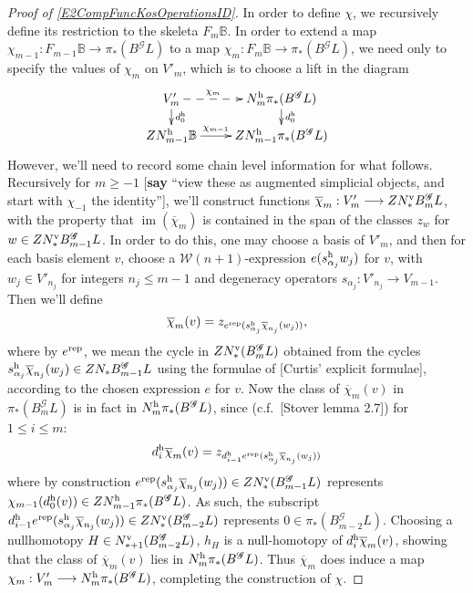 \documentclass[11pt]{amsart}
\theoremstyle{plain}
\theoremstyle{definition}
\DeclareMathOperator{\im}{im}
\renewcommand{\to}{\longrightarrow}
\newcommand{\scrQ}{\mathscr{Q}}
\newcommand{\scrR}{\mathscr{R}}
\newcommand{\scrT}{\mathscr{T}}
\newcommand{\scrY}{\mathscr{Y}}
\newcommand{\scrI}{\mathscr{I}}
\newcommand{\scrO}{\mathscr{O}}
\newcommand{\scrP}{\mathscr{P}}
\newcommand{\scrS}{\mathscr{S}}
\newcommand{\scrG}{\mathscr{G}}
\newcommand{\scrH}{\mathscr{H}}
\newcommand{\scrJ}{\mathscr{J}}
\newcommand{\scrK}{\mathscr{K}}
\newcommand{\scrL}{\mathscr{L}}
\newcommand{\scrZ}{\mathscr{Z}}
\newcommand{\scrN}{\mathscr{N}}
\newcommand{\scrM}{\mathscr{M}}
\newcommand{\calW}{\mathcal{W}}
\theoremstyle{plain}
\newcommand{\BSW}{{\scrG}}%
\newcommand{\BSWres}{B^\BSW}%
\begin{document}
\begin{Composite functor spectral sequences}
\begin{tricky proofs of operation compatibilities}
\begin{proof}[Proof of \ref{E2CompFuncKosOperationsID}]
In order to define $\chi$, we recursively define its restriction to the skeleta $F_m\mathbb{B}$. In order to extend a map $\chi_{m-1}:F_{m-1}\mathbb{B}\to \pi_*(\BSWres L)$ to a map $\chi_m:F_m\mathbb{B}\to \pi_*(\BSWres L)$, we need only to specify the values of $\chi_m$ on $V'_m$, which is to choose a lift in the diagram
\[\xymatrix@R=4mm{
V'_m\ar@{-->}[r]^-{\chi_m}
\ar[d]^-{d_0^\textup{h}}
&%
N^\textup{h}_m\pi_*(\BSWres L)\ar[d]^-{d_0^\textup{h}}
\\%
ZN^\textup{h}_{m-1}\mathbb{B}\ar[r]^-{\chi_{m-1}}
&%
ZN^\textup{h}_{m-1}\pi_*(\BSWres L)%
}\]
However, we'll need to record some chain level information for what follows. Recursively for $m\geq-1$ [\textbf{say} ``view these as augmented simplicial objects, and start with $\chi_{-1}$ the identity''], we'll construct functions $\overline{\chi}_m:V'_m\to ZN^\textup{v}_*\BSWres_m L$, with the property that $\im(\overline{\chi}_m)$ is contained in the span of the classes $z_{w}$ for $w\in ZN^\textup{v}_*\BSWres_{m-1}L$. In order to do this, one may choose a basis of $V'_m$, and then for each basis element $v$, choose a $\calW(n+1)$-expression $e(s^\textup{h}_{\alpha_j}w_j)$ for $v$, with $w_j\in V'_{n_j}$ for integers $n_j\leq m-1$ and degeneracy operators $s_{\alpha_j}:V'_{n_j}\to V_{m-1}$. Then we'll define
\[\overline{\chi}_m(v)=z_{e^\textup{rep}(s^\textup{h}_{\alpha_j}\overline{\chi}_{n_j}(w_j))},\]
where by $e^\textup{rep}$, we mean the cycle in $ZN_*^\textup{v}(\BSWres_mL)$ obtained from the cycles $s^\textup{h}_{\alpha_j}\overline{\chi}_{n_j}(w_j)\in ZN_*\BSWres_{m-1}L$ using the formulae of [Curtis' explicit formulae], according to the chosen expression $e$ for $v$.
Now the class of $\overline{\chi}_m(v)$ in $\pi_*(\BSWres_mL)$ is in fact in $N^\textup{h}_m\pi_*(\BSWres L)$, since (c.f.\ [Stover lemma 2.7]) for $1\leq i \leq m$:
\[d_i^\textup{h}\overline{\chi}_m(v)=z_{d^\textup{h}_{i-1}e^\textup{rep}(s^\textup{h}_{\alpha_j}\overline{\chi}_{n_j}(w_j))}\]
where by construction $e^\textup{rep}(s^\textup{h}_{\alpha_j}\overline{\chi}_{n_j}(w_j))\in ZN^\textup{v}_*(\BSWres_{m-1} L)$ represents $\chi_{m-1}(d_{0}^\textup{h}(v))\in ZN_{m-1}^\textup{h}\pi_*(\BSWres  L)$. As such, the subscript $d^\textup{h}_{i-1}e^\textup{rep}(s^\textup{h}_{\alpha_j}\overline{\chi}_{n_j}(w_j))\in ZN^\textup{v}_*(\BSWres_{m-2} L)$ represents $0\in\pi_*(\BSWres_{m-2}L)$. Choosing a nullhomotopy $H\in N^\textup{v}_{*+1}(\BSWres_{m-2}L)$, $h_H$ is a null-homotopy of $d_i^\textup{h}\overline{\chi}_m(v)$, showing that the class of  $\overline{\chi}_m(v)$ lies in $N^\textup{h}_m\pi_*(\BSWres L)$.
Thus $\overline{\chi}_m$ does induce a map $\chi_m:V'_m\to N_m^\textup{h}\pi_*(\BSWres L)$, completing the construction of $\chi$.







\end{proof}
\end{tricky proofs of operation compatibilities}
\end{Composite functor spectral sequences}
\end{document}
